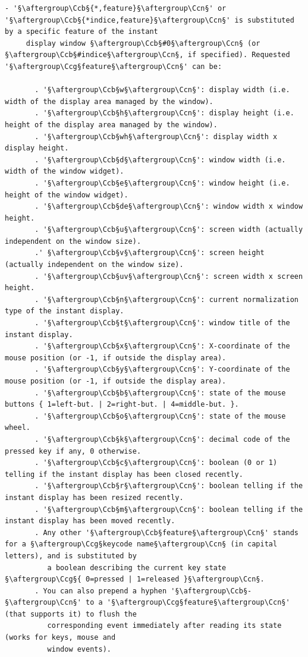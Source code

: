 \documentclass[a4paper,10.5pt,twoside]{book}
\def\Ccb{\color{cb}}
\def\Ccg{\color{cc}}
\def\Ccn{\color{black}}
\begin{document}
\begin{lstlisting}[escapechar=§]
  - '§\aftergroup\Ccb§{*,feature}§\aftergroup\Ccn§' or '§\aftergroup\Ccb§{*indice,feature}§\aftergroup\Ccn§' is substituted by a specific feature of the instant 
     display window §\aftergroup\Ccb§#0§\aftergroup\Ccn§ (or §\aftergroup\Ccb§#indice§\aftergroup\Ccn§, if specified). Requested '§\aftergroup\Ccg§feature§\aftergroup\Ccn§' can be: 
 
       . '§\aftergroup\Ccb§w§\aftergroup\Ccn§': display width (i.e. width of the display area managed by the window). 
       . '§\aftergroup\Ccb§h§\aftergroup\Ccn§': display height (i.e. height of the display area managed by the window). 
       . '§\aftergroup\Ccb§wh§\aftergroup\Ccn§': display width x display height. 
       . '§\aftergroup\Ccb§d§\aftergroup\Ccn§': window width (i.e. width of the window widget). 
       . '§\aftergroup\Ccb§e§\aftergroup\Ccn§': window height (i.e. height of the window widget). 
       . '§\aftergroup\Ccb§de§\aftergroup\Ccn§': window width x window height. 
       . '§\aftergroup\Ccb§u§\aftergroup\Ccn§': screen width (actually independent on the window size). 
       .' §\aftergroup\Ccb§v§\aftergroup\Ccn§': screen height (actually independent on the window size). 
       . '§\aftergroup\Ccb§uv§\aftergroup\Ccn§': screen width x screen height. 
       . '§\aftergroup\Ccb§n§\aftergroup\Ccn§': current normalization type of the instant display. 
       . '§\aftergroup\Ccb§t§\aftergroup\Ccn§': window title of the instant display. 
       . '§\aftergroup\Ccb§x§\aftergroup\Ccn§': X-coordinate of the mouse position (or -1, if outside the display area). 
       . '§\aftergroup\Ccb§y§\aftergroup\Ccn§': Y-coordinate of the mouse position (or -1, if outside the display area). 
       . '§\aftergroup\Ccb§b§\aftergroup\Ccn§': state of the mouse buttons { 1=left-but. | 2=right-but. | 4=middle-but. }. 
       . '§\aftergroup\Ccb§o§\aftergroup\Ccn§': state of the mouse wheel. 
       . '§\aftergroup\Ccb§k§\aftergroup\Ccn§': decimal code of the pressed key if any, 0 otherwise. 
       . '§\aftergroup\Ccb§c§\aftergroup\Ccn§': boolean (0 or 1) telling if the instant display has been closed recently. 
       . '§\aftergroup\Ccb§r§\aftergroup\Ccn§': boolean telling if the instant display has been resized recently. 
       . '§\aftergroup\Ccb§m§\aftergroup\Ccn§': boolean telling if the instant display has been moved recently. 
       . Any other '§\aftergroup\Ccb§feature§\aftergroup\Ccn§' stands for a §\aftergroup\Ccg§keycode name§\aftergroup\Ccn§ (in capital letters), and is substituted by 
          a boolean describing the current key state §\aftergroup\Ccg§{ 0=pressed | 1=released }§\aftergroup\Ccn§. 
       . You can also prepend a hyphen '§\aftergroup\Ccb§-§\aftergroup\Ccn§' to a '§\aftergroup\Ccg§feature§\aftergroup\Ccn§' (that supports it) to flush the 
          corresponding event immediately after reading its state (works for keys, mouse and 
          window events). 
 

\end{lstlisting}
\end{document}
